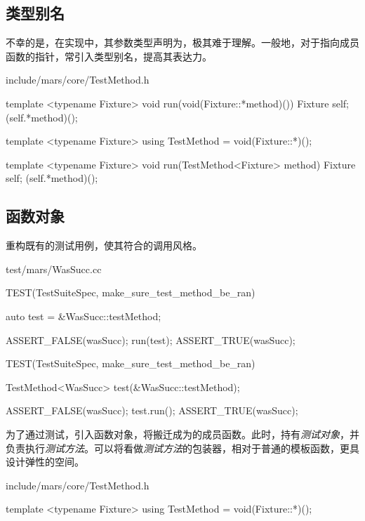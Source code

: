 \begin{content}
\subsection{类型别名}

不幸的是，在实现中，其参数类型声明为，极其难于理解。一般地，对于指向成员函数的指针，常引入类型别名，提高其表达力。

\begin{diff}{include/mars/core/TestMethod.h}
\begin{minicpp}
template <typename Fixture>
void run(void(Fixture::*method)()) {
  Fixture self;
  (self.*method)();
}
\end{minicpp}
\tcblower
\begin{minicpp}
template <typename Fixture>
using TestMethod = void(Fixture::*)();

template <typename Fixture>
void run(TestMethod<Fixture> method) {
  Fixture self;
  (self.*method)();
}
\end{minicpp}
\end{diff}

\subsection{函数对象}

重构既有的测试用例，使其符合的调用风格。

\begin{diff}{test/mars/WasSucc.cc}
\begin{minicpp}
TEST(TestSuiteSpec, make_sure_test_method_be_ran) {
  auto test = &WasSucc::testMethod;

  ASSERT_FALSE(wasSucc);
  run(test);
  ASSERT_TRUE(wasSucc);
}
\end{minicpp}
\tcblower
\begin{minicpp}
TEST(TestSuiteSpec, make_sure_test_method_be_ran) {
  TestMethod<WasSucc> test(&WasSucc::testMethod);

  ASSERT_FALSE(wasSucc);
  test.run();
  ASSERT_TRUE(wasSucc);
}
\end{minicpp}
\end{diff}

为了通过测试，引入函数对象，将搬迁成为的成员函数。此时，持有\emph{测试对象}，并负责执行\emph{测试方法}。可以将看做\emph{测试方法}的包装器，相对于普通的模板函数，更具设计弹性的空间。

\begin{diff}{include/mars/core/TestMethod.h}
\begin{minicpp}
template <typename Fixture>
using TestMethod = void(Fixture::*)();


\end{minicpp}
\end{diff}
\end{content}
